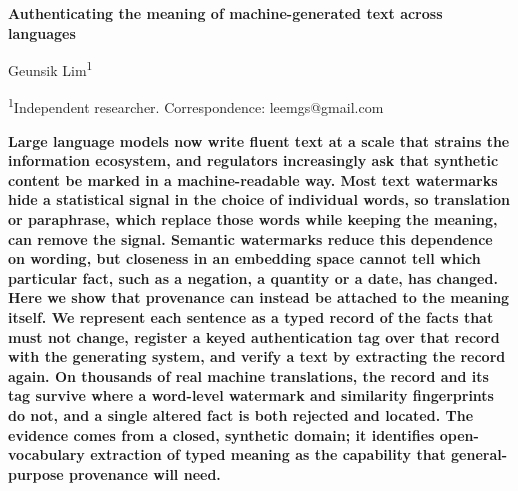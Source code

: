 \documentclass[12pt]{article}
\begin{document}
\begin{flushleft}
{\Large\bfseries Authenticating the meaning of machine-generated text across languages\par}
\bigskip
Geunsik Lim\textsuperscript{1}\par
\medskip
{\small \textsuperscript{1}Independent researcher. Correspondence: leemgs@gmail.com\par}
\end{flushleft}

\bigskip

\noindent\textbf{%
Large language models now write fluent text at a scale that strains the information ecosystem, and regulators increasingly ask that synthetic content be marked in a machine-readable way\cite{euaiact2024}. Most text watermarks hide a statistical signal in the choice of individual words\cite{kirchenbauer2023kgw,dathathri2024synthid}, so translation or paraphrase, which replace those words while keeping the meaning, can remove the signal\cite{he2024crosslingual}. Semantic watermarks reduce this dependence on wording\cite{hou2024semstamp,liu2023sir}, but closeness in an embedding space cannot tell which particular fact, such as a negation, a quantity or a date, has changed. Here we show that provenance can instead be attached to the meaning itself. We represent each sentence as a typed record of the facts that must not change, register a keyed authentication tag over that record with the generating system, and verify a text by extracting the record again. On thousands of real machine translations, the record and its tag survive where a word-level watermark and similarity fingerprints do not, and a single altered fact is both rejected and located. The evidence comes from a closed, synthetic domain; it identifies open-vocabulary extraction of typed meaning as the capability that general-purpose provenance will need.}

\bigskip
\end{document}

